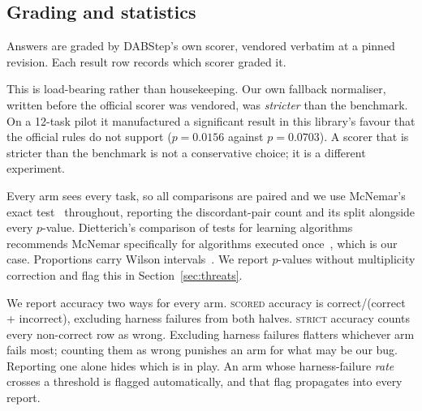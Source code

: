 \subsection{Grading and statistics}

Answers are graded by DABStep's own scorer, vendored verbatim at a pinned
revision. Each result row records which scorer graded it.

This is load-bearing rather than housekeeping. Our own fallback normaliser,
written before the official scorer was vendored, was \emph{stricter} than the
benchmark. On a 12-task pilot it manufactured a significant result in this
library's favour that the official rules do not support ($p{=}0.0156$ against
$p{=}0.0703$). A scorer that is stricter than the benchmark is not a
conservative choice; it is a different experiment.

Every arm sees every task, so all comparisons are paired and we use McNemar's
exact test~\cite{mcnemar} throughout, reporting the discordant-pair count and
its split alongside every $p$-value. Dietterich's comparison of tests for
learning algorithms recommends McNemar specifically for algorithms executed
once~\cite{dietterich}, which is our case. Proportions carry Wilson
intervals~\cite{wilson,brown-cai-dasgupta}. We report $p$-values without
multiplicity correction and flag this in Section~\ref{sec:threats}.

We report accuracy two ways for every arm. \textsc{scored} accuracy is
correct/(correct + incorrect), excluding harness failures from both halves.
\textsc{strict} accuracy counts every non-correct row as wrong. Excluding
harness failures flatters whichever arm fails most; counting them as wrong
punishes an arm for what may be our bug. Reporting one alone hides which is in
play. An arm whose harness-failure \emph{rate} crosses a threshold is flagged
automatically, and that flag propagates into every report.
